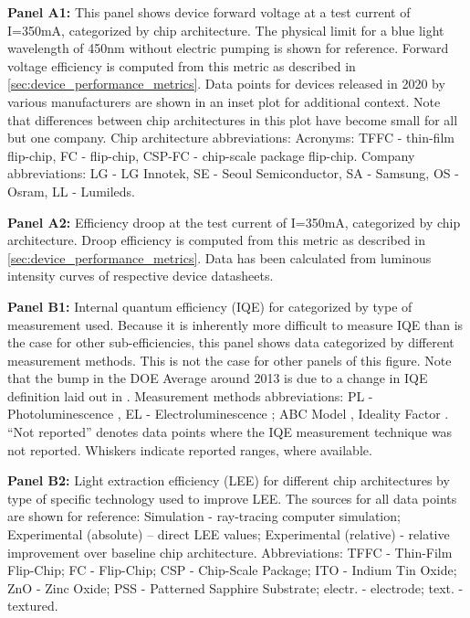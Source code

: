 \documentclass[parskip=full]{article}
\begin{document}
\clearpage

\textbf{Panel A1:} This panel shows device forward voltage at a test current of I=350mA, categorized by chip architecture. The physical limit for a blue light wavelength of 450nm without electric pumping is shown for reference. Forward voltage efficiency is computed from this metric as described in \cref{sec:device_performance_metrics}. Data points for devices released in 2020 by various manufacturers are shown in an inset plot for additional context. Note that differences between chip architectures in this plot have become small for all but one company. Chip architecture abbreviations: Acronyms: TFFC - thin-film flip-chip, FC - flip-chip, CSP-FC - chip-scale package flip-chip. Company abbreviations: LG - LG Innotek, SE - Seoul Semiconductor, SA - Samsung, OS - Osram, LL - Lumileds.  \

\textbf{Panel A2:} Efficiency droop at the test current of I=350mA, categorized by chip architecture. Droop efficiency is computed from this metric as described in \cref{sec:device_performance_metrics}. Data has been calculated from luminous intensity curves of respective device datasheets. \

\textbf{Panel B1:} Internal quantum efficiency (IQE) for categorized by type of measurement used. Because it is inherently more difficult to measure IQE than is the case for other sub-efficiencies, this panel shows data categorized by different measurement methods. This is not the case for other panels of this figure. Note that the bump in the DOE Average around 2013 is due to a change in IQE definition laid out in \cite{doe_ssl_multiyear_2013}. Measurement methods abbreviations: PL - Photoluminescence \cite{Shim_2018}, EL - Electroluminescence \cite{Getty_2009}; ABC Model \cite{Karpov_2014}, Ideality Factor \cite{Masui_2010}. “Not reported” denotes data points where the IQE measurement technique was not reported. Whiskers indicate reported ranges, where available. \

\textbf{Panel B2:} Light extraction efficiency (LEE) for different chip architectures by type of specific technology used to improve LEE. The sources for all data points are shown for reference: Simulation - ray-tracing computer simulation; Experimental (absolute) – direct LEE values; Experimental (relative) - relative improvement over baseline chip architecture. Abbreviations: TFFC - Thin-Film Flip-Chip; FC - Flip-Chip; CSP - Chip-Scale Package; ITO - Indium Tin Oxide; ZnO - Zinc Oxide; PSS - Patterned Sapphire Substrate; electr. - electrode; text. - textured.
\end{document}
